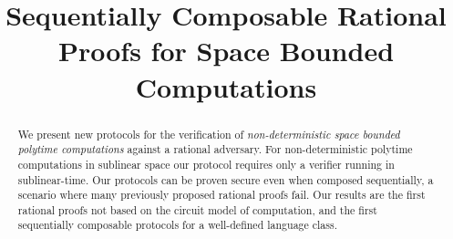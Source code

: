 \documentclass{llncs}
\title{Sequentially Composable Rational Proofs for Space Bounded Computations}
\author{}
\institute{}
\date{}
\begin{document}
\maketitle


\newcommand{\protOne}{\pi^{L_2}_{1}}
\newcommand{\protTwo}{\pi_{2}}
\newcommand{\rewGap}{\Delta}
\newcommand{\STEP}{\function{STEP}}

\newcommand{\disTransc}{\tilde{\Tau}}


\begin{abstract}
We present new protocols for the verification of {\em non-deterministic space bounded polytime computations} against a rational adversary.
For non-deterministic polytime computations in sublinear space our protocol requires only a verifier running in sublinear-time. Our protocols can be proven 
secure even when composed sequentially, a scenario where many previously proposed rational proofs fail. Our results are the first rational proofs not based on the circuit model of computation, and the first sequentially composable protocols for a well-defined language class. 
\end{abstract}


\begin{comment}
\begin{abstract}
This paper presents new protocols for the verification of {\em non-deterministic space-bounded polytime computations} against a rational adversary. More specifically consider a language $L \in \NTISP(T(n), S(n))$, i.e. a language recognized by a non-deterministic Turing Machine $M_L$ which runs in time $T(n)$ and space $S(n)$. 
We construct a protocol where a rational prover can
convince the verifier that $x \in L$ with the following properties: 
\begin{itemize}
\item The verifier runs in time $O(S(n) \log n)$;
\item The protocol terminates in $O(\log n)$ rounds and communication complexity $O(S(n) \log n)$;
\item The prover simply runs $M_L(x)$ and stores all the intermediate configurations (i.e. requires space $O(S(n) T(n))$.
\end{itemize}
Note that for polytime computations in sublinear space this gives a protocol in which the verifier is sublinear-time. 
\end{abstract}
\end{comment}
\end{document}
